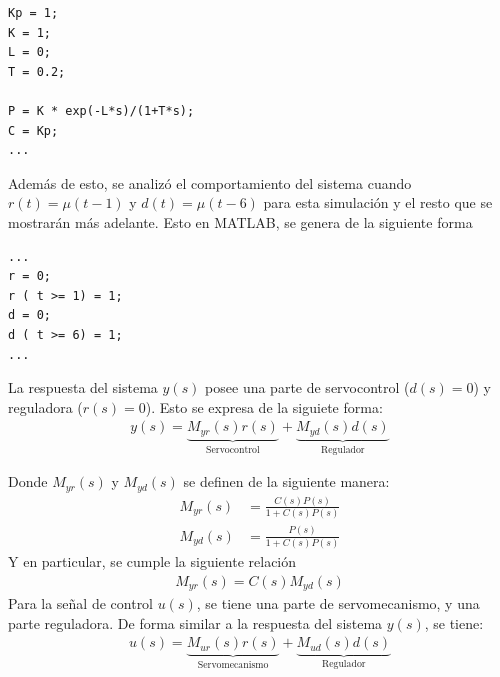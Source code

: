 \begin{itemize}
\begin{mdframed}
\begin{verbatim}
Kp = 1;
K = 1;
L = 0;
T = 0.2;

P = K * exp(-L*s)/(1+T*s);
C = Kp;
...
\end{verbatim}
\end{mdframed}

Además de esto, se analizó el comportamiento del sistema cuando $r(t) = \mu(t-1)$ y $d(t) = \mu(t-6)$ para esta simulación y el resto que se mostrarán más adelante. Esto en MATLAB, se genera de la siguiente forma

\vspace{1em}
\begin{mdframed}
\begin{verbatim}
...
r = 0;
r ( t >= 1) = 1;
d = 0; 
d ( t >= 6) = 1;
...
\end{verbatim}
\end{mdframed}

La respuesta del sistema $y(s)$ posee una parte de servocontrol ($d(s) = 0$) y reguladora ($r(s) = 0$). Esto se expresa de la siguiete forma:
\begin{align*}
    y(s) =\underbrace{M _{yr}(s)r(s)}_{\text{Servocontrol}} + \underbrace{M _{yd}(s)d(s)}_\text{{Regulador}}
\end{align*}

Donde $M _{yr}(s)$ y $M _{yd}(s)$ se definen de la siguiente manera:
\begin{align*}
    M _{yr}(s) &= \frac{C(s)P(s)}{ 1 + C(s)P(s)}\\
    M _{yd}(s) &= \frac{P(s)}{ 1 + C(s)P(s)}
\end{align*}
Y en particular, se cumple la siguiente relación
\begin{align*}
    M _{yr}(s) = C(s)M _{yd}(s)
\end{align*}
Para la señal de control $u(s)$, se tiene una parte de servomecanismo, y una parte reguladora. De forma similar a la respuesta del sistema $y(s)$, se tiene:
\begin{align*}
    u(s) =\underbrace{M _{ur}(s)r(s)}_{\text{Servomecanismo}} + \underbrace{M _{ud}(s)d(s)}_\text{{Regulador}}
\end{align*}


\end{itemize}

